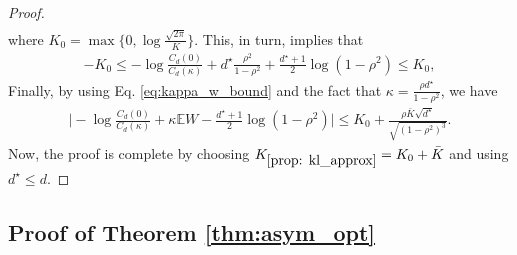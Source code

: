 \documentclass[12pt]{article}
\theoremstyle{definition}
\theoremstyle{remark}
\begin{document}
\begin{proof}
\begin{align*}
\end{align*}
where $K_0 =\max\big\{0, \log \frac{\sqrt{2\pi}}{K} \big\}$. This, in turn, implies that
\begin{align*}
  -K_0 \leq  -\log \frac{C_{d}(0)}{C_{d}(\kappa)} +  d^\star \frac{\rho^2}{1-\rho^2} +\frac{d^\star +1}{2} \log(1-\rho^2) \leq K_0,
\end{align*}
Finally, by using Eq. \eqref{eq:kappa_w_bound} and the fact that $\kappa = \frac{\rho d^\star}{1-\rho^2}$, we have
\begin{align*}
    \Big| -\log \frac{C_{d}(0)}{C_{d}(\kappa)} + \kappa \mathbb{E} W -\frac{d^\star +1}{2} \log(1-\rho^2) \Big| \leq K_0 + \frac{\rho \bar K \sqrt{d^\star }}{\sqrt{(1-\rho^2)^3}}.
\end{align*}
Now, the proof is complete by choosing $K_{\ref{prop: kl_approx}} = K_0 + \bar K$ and using $d^\star \leq d$.
\end{proof}

\subsection{Proof of Theorem \ref{thm:asym_opt}}
\label{app:proof_thm_asym_opt}
\end{document}
